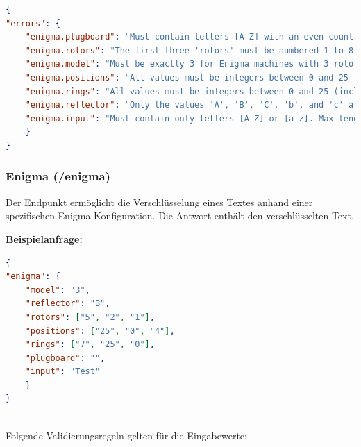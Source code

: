 \documentclass[12pt, ngerman, a4paper, numbers=noenddot]{article}
\begin{document}
\begin{lstlisting}[language=json]
{
"errors": {
	"enigma.plugboard": "Must contain letters [A-Z] with an even count, maximum 26 letters, no separators allowed.",
	"enigma.rotors": "The first three 'rotors' must be numbered 1 to 8; if a fourth rotor is used, it must be 9 or 10.",
	"enigma.model": "Must be exactly 3 for Enigma machines with 3 rotors, and exactly 4 for machines with 4 rotors.",
	"enigma.positions": "All values must be integers between 0 and 25 (inclusive) and the array length must correspond to the number of rotors",
	"enigma.rings": "All values must be integers between 0 and 25 (inclusive) and the array length must correspond to the number of rotors",
	"enigma.reflector": "Only the values 'A', 'B', 'C', 'b', and 'c' are permitted.",
	"enigma.input": "Must contain only letters [A-Z] or [a-z]. Max length is 10000"
	}
}
\end{lstlisting}

\newpage
\subsubsection{Enigma (/enigma)}

Der Endpunkt ermöglicht die Verschlüsselung eines Textes anhand einer spezifischen Enigma-Konfiguration. Die Antwort enthält den verschlüsselten Text. 

\textbf{Beispielanfrage:}
\begin{lstlisting}[language=json, caption={Gültige Anfrage an /enigma}]
{
"enigma": {
	"model": "3",
	"reflector": "B",
	"rotors": ["5", "2", "1"],
	"positions": ["25", "0", "4"],
	"rings": ["7", "25", "0"],
	"plugboard": "",
	"input": "Test"
	}
}
\end{lstlisting}
\ \\
Folgende Validierungsregeln gelten für die Eingabewerte:
\end{document}
